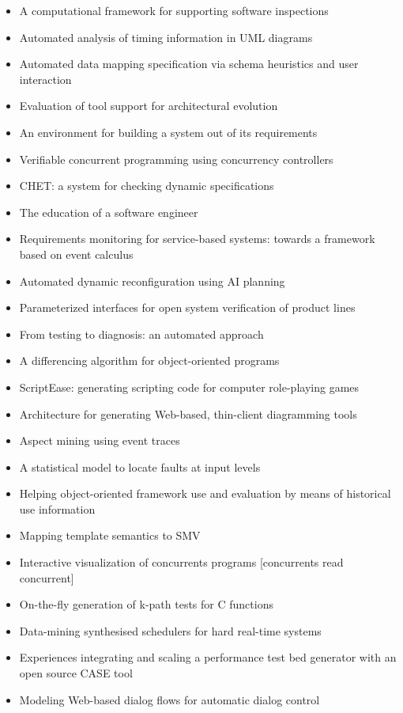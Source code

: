 {\begin{itemize}[itemsep=-1ex]
  \item A computational framework for supporting software inspections
  \item Automated analysis of timing information in UML diagrams
  \item Automated data mapping specification via schema heuristics and user interaction
  \item Evaluation of tool support for architectural evolution
  \item An environment for building a system out of its requirements
  \item Verifiable concurrent programming using concurrency controllers
  \item CHET: a system for checking dynamic specifications
  \item The education of a software engineer
  \item Requirements monitoring for service-based systems: towards a framework based on event calculus
  \item Automated dynamic reconfiguration using AI planning
  \item Parameterized interfaces for open system verification of product lines
  \item From testing to diagnosis: an automated approach
  \item A differencing algorithm for object-oriented programs
  \item ScriptEase: generating scripting code for computer role-playing games
  \item Architecture for generating Web-based, thin-client diagramming tools
  \item Aspect mining using event traces
  \item A statistical model to locate faults at input levels
  \item Helping object-oriented framework use and evaluation by means of historical use information
  \item Mapping template semantics to SMV
  \item Interactive visualization of concurrents programs [concurrents read concurrent]
  \item On-the-fly generation of k-path tests for C functions
  \item Data-mining synthesised schedulers for hard real-time systems
  \item Experiences integrating and scaling a performance test bed generator with an open source CASE tool
  \item Modeling Web-based dialog flows for automatic dialog control

\end{itemize}}
